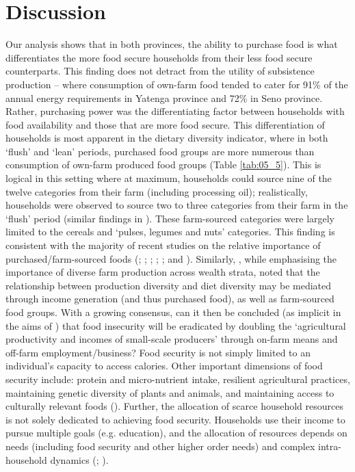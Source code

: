 \section{Discussion}

Our analysis shows that in both provinces, the ability to purchase food is what differentiates the more food secure households from their less food secure counterparts. This finding does not detract from the utility of subsistence production -- where consumption of own-farm food tended to cater for 91\% of the annual energy requirements in Yatenga province and 72\% in Seno province. Rather, purchasing power was the differentiating factor between households with food availability and those that are more food secure. This differentiation of households is most apparent in the dietary diversity indicator, where in both `flush' and `lean' periods, purchased food groups are more numerous than consumption of own-farm produced food groups (Table \ref{tab:05_5}). This is logical in this setting where at maximum, households could source nine of the twelve categories from their farm (including processing oil); realistically, households were observed to source two to three categories from their farm in the `flush' period (similar findings in \citealp{Some2018}). These farm-sourced categories were largely limited to the cereals and `pulses, legumes and nuts' categories. This finding is consistent with the majority of recent studies on the relative importance of purchased/farm-sourced foods (\citealp{Bellon2016}; \citealp{Koppmair2017325}; \citealp{Luckett20152479}; \citealp{Sibhatu201510657}; \citealp{Snapp2015}; and \citealp{Dillon2014}). Similarly, \citet{Jones2016}, while emphasising the importance of diverse farm production across wealth strata, noted that the relationship between production diversity and diet diversity may be mediated through income generation (and thus purchased food), as well as farm-sourced food groups. With a growing consensus, can it then be concluded (as implicit in the aims of \citealp{FAO2016a}) that food insecurity will be eradicated by doubling the `agricultural productivity and incomes of small-scale producers' through on-farm means and off-farm employment/business? Food security is not simply limited to an individual's capacity to access calories. Other important dimensions of food security include: protein and micro-nutrient intake, resilient agricultural practices, maintaining genetic diversity of plants and animals, and maintaining access to culturally relevant foods (\citealp{FAO2008}). Further, the allocation of scarce household resources is not solely dedicated to achieving food security. Households use their income to pursue multiple goals (e.g. education), and the allocation of resources depends on needs (including food security and other higher order needs) and complex intra-household dynamics (\citealp{Kazianga2017}; \citealp{Galie2015}).

